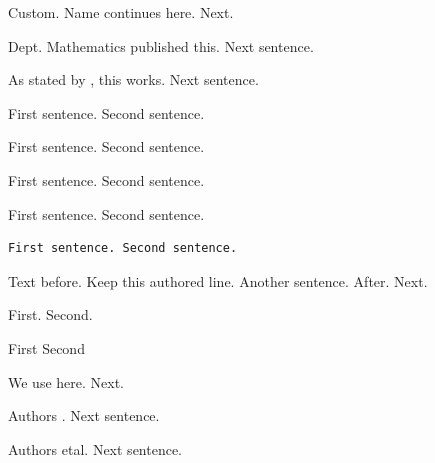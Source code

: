 
Custom. Name continues here.
Next.

Dept. Mathematics published this.
Next sentence.

As stated by , this works.
Next sentence.

\begin{frame}
  First sentence.
  Second sentence.
\end{frame}

\begin{minipage}{0.5\textwidth}
  First sentence.
  Second sentence.
\end{minipage}

\begin{mytheorem}
  First sentence.
  Second sentence.
\end{mytheorem}

\begin{unknown}
  First sentence. Second sentence.
\end{unknown}

\begin{verbatim}
First sentence. Second sentence.
\end{verbatim}

Text before.
 Keep this authored line. Another sentence.
After.
Next.

\newenvironment{local}{}{}
\begin{local}
  First.
  Second.
\end{local}

\begin{itemize}
    \myitem First
    \myitem Second
\end{itemize}

We use  here.
Next.

Authors \etal. Next sentence.

Authors etal.
Next sentence.
